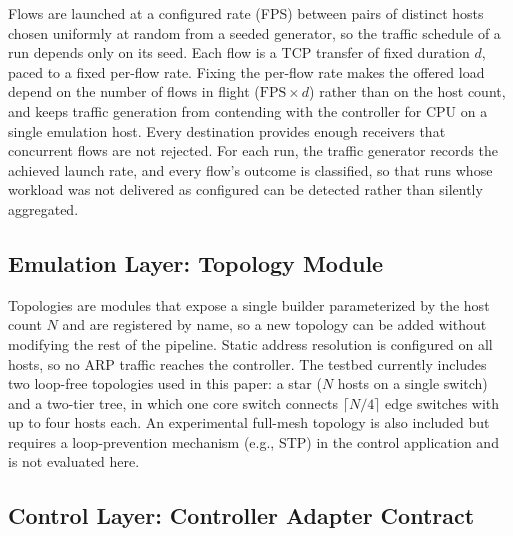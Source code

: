 \documentclass[conference]{IEEEtran}
\begin{document}
Flows are launched at a configured rate (FPS) between pairs of
distinct hosts chosen uniformly at random from a seeded generator,
so the traffic schedule of a run depends only on its seed. Each
flow is a TCP transfer of fixed duration $d$, paced to a fixed
per-flow rate. Fixing the per-flow rate makes the offered load
depend on the number of flows in flight ($\text{FPS}\times d$)
rather than on the host count, and keeps traffic generation from
contending with the controller for CPU on a single emulation
host. Every destination provides enough receivers that
concurrent flows are not rejected. For each run, the traffic
generator records the achieved launch rate, and every flow's
outcome is classified, so that runs whose workload was not
delivered as configured can be detected rather than silently
aggregated.

\subsection{Emulation Layer: Topology Module}

Topologies are modules that expose a single builder
parameterized by the host count $N$ and are registered by name,
so a new topology can be added without modifying the rest of the
pipeline. Static address resolution is configured on all hosts,
so no ARP traffic reaches the controller. The testbed currently
includes two loop-free topologies used in this paper: a star
($N$ hosts on a single switch) and a two-tier tree, in which one
core switch connects $\lceil N/4 \rceil$ edge switches with up to
four hosts each. An experimental full-mesh topology is also
included but requires a loop-prevention mechanism (e.g., STP) in
the control application and is not evaluated here.

\subsection{Control Layer: Controller Adapter Contract}
\label{sec:contract}
\end{document}
